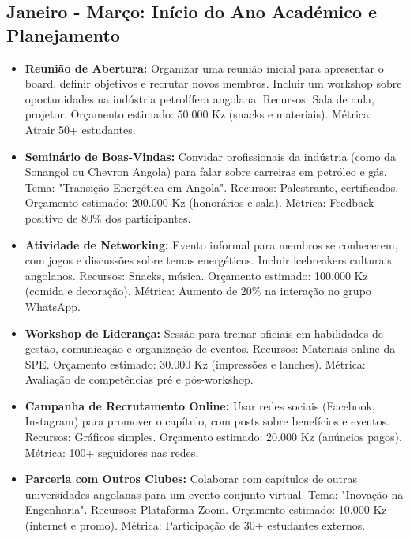 \documentclass[12pt]{article}
\begin{document}
\subsection{Janeiro - Março: Início do Ano Académico e Planejamento}
\begin{itemize}
    \item \textbf{Reunião de Abertura:} Organizar uma reunião inicial para apresentar o board, definir objetivos e recrutar novos membros. Incluir um workshop sobre oportunidades na indústria petrolífera angolana. Recursos: Sala de aula, projetor. Orçamento estimado: 50.000 Kz (snacks e materiais). Métrica: Atrair 50+ estudantes.
    \item \textbf{Seminário de Boas-Vindas:} Convidar profissionais da indústria (como da Sonangol ou Chevron Angola) para falar sobre carreiras em petróleo e gás. Tema: "Transição Energética em Angola". Recursos: Palestrante, certificados. Orçamento estimado: 200.000 Kz (honorários e sala). Métrica: Feedback positivo de 80\% dos participantes.
    \item \textbf{Atividade de Networking:} Evento informal para membros se conhecerem, com jogos e discussões sobre temas energéticos. Incluir icebreakers culturais angolanos. Recursos: Snacks, música. Orçamento estimado: 100.000 Kz (comida e decoração). Métrica: Aumento de 20\% na interação no grupo WhatsApp.
    \item \textbf{Workshop de Liderança:} Sessão para treinar oficiais em habilidades de gestão, comunicação e organização de eventos. Recursos: Materiais online da SPE. Orçamento estimado: 30.000 Kz (impressões e lanches). Métrica: Avaliação de competências pré e pós-workshop.
    \item \textbf{Campanha de Recrutamento Online:} Usar redes sociais (Facebook, Instagram) para promover o capítulo, com posts sobre benefícios e eventos. Recursos: Gráficos simples. Orçamento estimado: 20.000 Kz (anúncios pagos). Métrica: 100+ seguidores nas redes.
    \item \textbf{Parceria com Outros Clubes:} Colaborar com capítulos de outras universidades angolanas para um evento conjunto virtual. Tema: "Inovação na Engenharia". Recursos: Plataforma Zoom. Orçamento estimado: 10.000 Kz (internet e promo). Métrica: Participação de 30+ estudantes externos.
\end{itemize}
\end{document}
